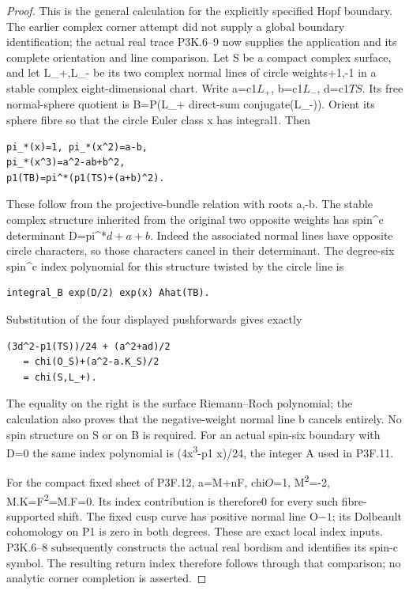\begin{proof}
This is the general calculation for the explicitly specified Hopf boundary. The earlier complex corner attempt did not supply a global boundary identification; the actual real trace P3K.6--9 now supplies the application and its complete orientation and line comparison. Let S be a compact complex surface, and let L\_+,L\_- be its two complex normal lines of circle weights+1,-1 in a stable complex eight-dimensional chart. Write a=c1\(L_+\), b=c1\(L_-\), d=c1\(TS\). Its free normal-sphere quotient is B=P(L\_+ direct-sum conjugate(L\_-)). Orient its sphere fibre so that the circle Euler class x has integral1. Then

\begin{lstlisting}
pi_*(x)=1, pi_*(x^2)=a-b,
pi_*(x^3)=a^2-ab+b^2,
p1(TB)=pi^*(p1(TS)+(a+b)^2).
\end{lstlisting}

These follow from the projective-bundle relation with roots a,-b. The stable complex structure inherited from the original two opposite weights has spin\^{}c determinant D=pi\^{}*\(d+a+b\). Indeed the associated normal lines have opposite circle characters, so those characters cancel in their determinant. The degree-six spin\^{}c index polynomial for this structure twisted by the circle line is

\begin{lstlisting}
integral_B exp(D/2) exp(x) Ahat(TB).
\end{lstlisting}

Substitution of the four displayed pushforwards gives exactly

\begin{lstlisting}
(3d^2-p1(TS))/24 + (a^2+ad)/2
   = chi(O_S)+(a^2-a.K_S)/2
   = chi(S,L_+).
\end{lstlisting}

The equality on the right is the surface Riemann--Roch polynomial; the calculation also proves that the negative-weight normal line b cancels entirely. No spin structure on S or on B is required. For an actual spin-six boundary with D=0 the same index polynomial is (4x\textsuperscript{3}-p1 x)/24, the integer A used in P3F.11.

For the compact fixed sheet of P3F.12, a=M+nF, chi\(O\)=1, M\textsuperscript{2}=-2, M.K=F\textsuperscript{2}=M.F=0. Its index contribution is therefore0 for every such fibre-supported shift. The fixed cusp curve has positive normal line O\(-1\); its Dolbeault cohomology on P1 is zero in both degrees. These are exact local index inputs. P3K.6--8 subsequently constructs the actual real bordism and identifies its spin-c symbol. The resulting return index therefore follows through that comparison; no analytic corner completion is asserted.
\end{proof}
